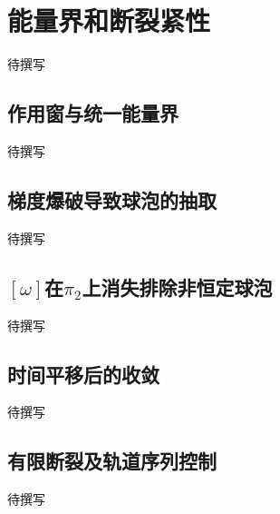 
% 
% 

\section{能量界和断裂紧性}
\label{g4:sec:2601}

待撰写

\subsection{作用窗与统一能量界}
\label{g4:subsec:2601:01}
待撰写

\subsection{梯度爆破导致球泡的抽取}
\label{g4:subsec:2601:02}
待撰写

\subsection{\texorpdfstring{\([\omega]\)在\(\pi_2\)上消失排除非恒定球泡}{[\GeometryPdfSmallOmega{}]在\GeometryPdfPi{}₂上消失排除非恒定球泡}}
\label{g4:subsec:2601:03}
待撰写

\subsection{时间平移后的收敛}
\label{g4:subsec:2601:04}
待撰写

\subsection{有限断裂及轨道序列控制}
\label{g4:subsec:2601:05}
待撰写
